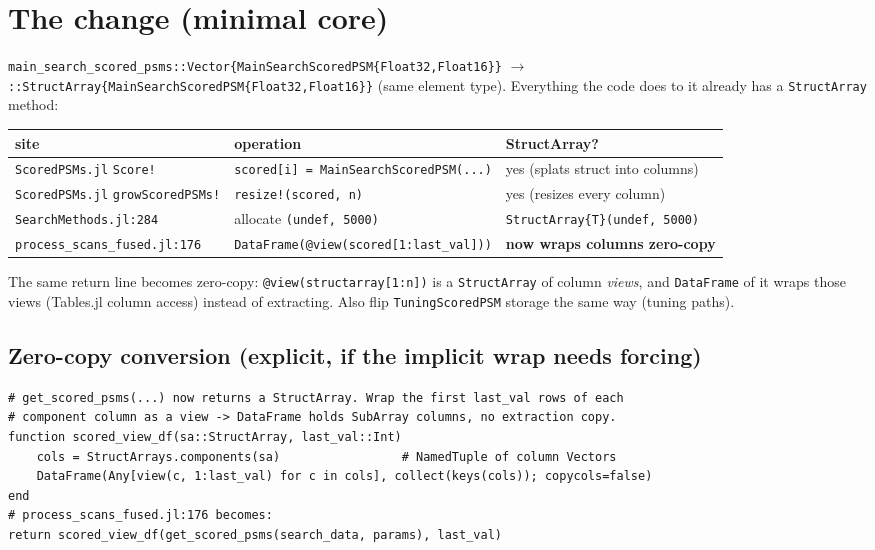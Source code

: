 \documentclass[11pt]{article}
\newcommand{\code}[1]{\texttt{\small #1}}
\begin{document}
\section{The change (minimal core)}
\code{main\_search\_scored\_psms::Vector\{MainSearchScoredPSM\{Float32,Float16\}\}}
$\rightarrow$ \code{::StructArray\{MainSearchScoredPSM\{Float32,Float16\}\}} (same element type).
Everything the code does to it already has a \code{StructArray} method:
\begin{center}\begin{tabular}{lll}
\toprule
site & operation & StructArray? \\
\midrule
\code{ScoredPSMs.jl} \code{Score!} & \code{scored[i] = MainSearchScoredPSM(...)} & yes (splats struct into columns) \\
\code{ScoredPSMs.jl} \code{growScoredPSMs!} & \code{resize!(scored, n)} & yes (resizes every column) \\
\code{SearchMethods.jl:284} & allocate \code{(undef, 5000)} & \code{StructArray\{T\}(undef, 5000)} \\
\code{process\_scans\_fused.jl:176} & \code{DataFrame(@view(scored[1:last\_val]))} & \textbf{now wraps columns zero-copy} \\
\bottomrule
\end{tabular}\end{center}
The same return line becomes zero-copy: \code{@view(structarray[1:n])} is a \code{StructArray}
of column \emph{views}, and \code{DataFrame} of it wraps those views (Tables.jl column access)
instead of extracting. Also flip \code{TuningScoredPSM} storage the same way (tuning paths).

\subsection{Zero-copy conversion (explicit, if the implicit wrap needs forcing)}
\begin{lstlisting}
# get_scored_psms(...) now returns a StructArray. Wrap the first last_val rows of each
# component column as a view -> DataFrame holds SubArray columns, no extraction copy.
function scored_view_df(sa::StructArray, last_val::Int)
    cols = StructArrays.components(sa)                 # NamedTuple of column Vectors
    DataFrame(Any[view(c, 1:last_val) for c in cols], collect(keys(cols)); copycols=false)
end
# process_scans_fused.jl:176 becomes:
return scored_view_df(get_scored_psms(search_data, params), last_val)
\end{lstlisting}
\end{document}
